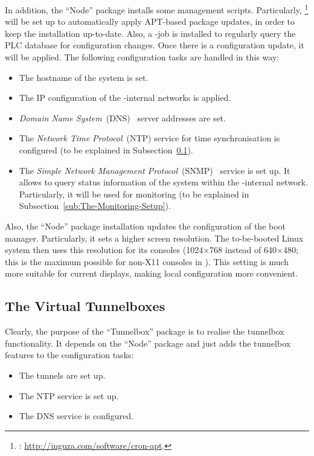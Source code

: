 In addition, the ``Node'' package installs some management scripts. Particularly, \footnote{: \url{http://inguza.com/software/cron-apt}.} will be set up to automatically apply APT-based package updates, in order to keep the installation up-to-date. Also, a -job is installed to regularly query the PLC database for configuration changes. Once there is a configuration update, it will be applied. The following configuration tasks are handled in this way:
\begin{itemize}
 \item The hostname of the system is set.
 \item The IP configuration of the -internal networks is applied.
 \item \emph{Domain Name System}~(DNS)~\cite{RFC1035} server addresses are set.
 \item The \emph{Network Time Protocol}~(NTP) service for time synchronisation is configured (to be explained in Subsection~\ref{sub:The-Tunnelboxes}).
 \item The \emph{Simple Network Management Protocol}~(SNMP)~\cite{RFC3411} service is set up. It allows to query status information of the system within the -internal network. Particularly, it will be used for monitoring (to be explained in Subsection~\ref{sub:The-Monitoring-Setup}).
\end{itemize}

Also, the ``Node'' package installation updates the configuration of the  boot manager. Particularly, it sets a higher screen resolution. The to-be-booted Linux system then uses this resolution for its consoles (1024$\times$768 instead of 640$\times$480; this is the maximum possible for non-X11 consoles in ). This setting is much more suitable for current displays, making local configuration more convenient.


\subsection{The Virtual Tunnelboxes}
\label{sub:The-Tunnelboxes}

Clearly, the purpose of the ``Tunnelbox'' package is to realise the tunnelbox functionality. It depends on the ``Node'' package and just adds the tunnelbox features to the configuration tasks:
\begin{itemize}
 \item The tunnels are set up.
 \item The NTP service is set up.
 \item The DNS service is configured.
\end{itemize}

